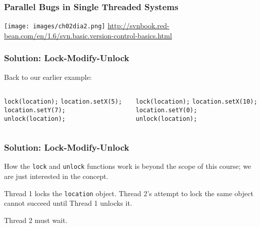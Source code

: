 \begin{frame}
\frametitle{Parallel Bugs in Single Threaded Systems}
\begin{changemargin}{1cm}

\begin{center}
	\texttt{[image: images/ch02dia2.png]}
	\hfill {\tiny \url{http://svnbook.red-bean.com/en/1.6/svn.basic.version-control-basics.html}}
\end{center} 

\end{changemargin}
\end{frame}

\begin{frame}
\frametitle{Solution: Lock-Modify-Unlock}
\begin{changemargin}{1cm}

Back to our earlier example:

\begin{columns}


		\texttt{lock(location);} 
		\texttt{location.setX(5);}
		\texttt{location.setY(7);}
		\texttt{unlock(location);}
		

		\texttt{lock(location);} 
		\texttt{location.setX(10);}
		\texttt{location.setY(0);}
		\texttt{unlock(location);}

\end{columns}

\end{changemargin}
\end{frame}


\begin{frame}
\frametitle{Solution: Lock-Modify-Unlock}
\begin{changemargin}{1cm}

How the \texttt{lock} and \texttt{unlock} functions work is beyond the scope of this course; we are just interested in the concept.

Thread 1 locks the \texttt{location} object. Thread 2's attempt to lock the same object cannot succeed until Thread 1 unlocks it.

Thread 2 must wait.

\end{changemargin}
\end{frame}

